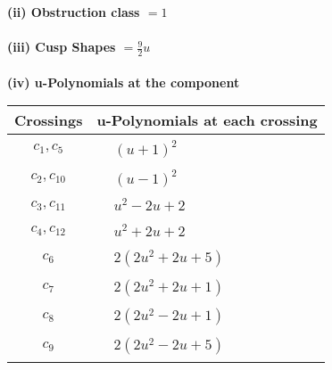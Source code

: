 \documentclass[1p]{elsarticle_modified}
\theoremstyle{definition}
\begin{document}
\flushleft \textbf{(ii) Obstruction class $= 1$}\\~\\
\flushleft \textbf{(iii) Cusp Shapes $= \frac{9}{2} u$}\\~\\
\newpage\renewcommand{\arraystretch}{1}
\flushleft \textbf{(iv) u-Polynomials at the component}\newline \\
\begin{tabular}{m{50pt}|m{274pt}}
Crossings & \hspace{64pt}u-Polynomials at each crossing \\
\hline $$\begin{aligned}c_{1},c_{5}\end{aligned}$$&$\begin{aligned}
&(u+1)^2
\end{aligned}$\\
\hline $$\begin{aligned}c_{2},c_{10}\end{aligned}$$&$\begin{aligned}
&(u-1)^2
\end{aligned}$\\
\hline $$\begin{aligned}c_{3},c_{11}\end{aligned}$$&$\begin{aligned}
&u^2-2 u+2
\end{aligned}$\\
\hline $$\begin{aligned}c_{4},c_{12}\end{aligned}$$&$\begin{aligned}
&u^2+2 u+2
\end{aligned}$\\
\hline $$\begin{aligned}c_{6}\end{aligned}$$&$\begin{aligned}
&2(2 u^2+2 u+5)
\end{aligned}$\\
\hline $$\begin{aligned}c_{7}\end{aligned}$$&$\begin{aligned}
&2(2 u^2+2 u+1)
\end{aligned}$\\
\hline $$\begin{aligned}c_{8}\end{aligned}$$&$\begin{aligned}
&2(2 u^2-2 u+1)
\end{aligned}$\\
\hline $$\begin{aligned}c_{9}\end{aligned}$$&$\begin{aligned}
&2(2 u^2-2 u+5)
\end{aligned}$\\
\hline
\end{tabular}\\~\\
\end{document}
